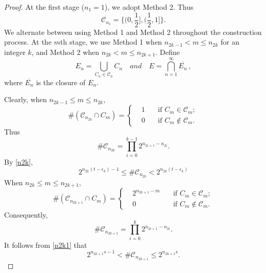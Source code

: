 \documentclass[12pt]{article}
\newcommand{\1}{{\bf 1}}
\begin{document}
\begin{proof}
		At the first stage ($n_1=1$), we adopt Method 2. Thus
		\begin{equation*}
			\textstyle{\mathcal{C}_{n_1}=\big\{(0,\frac{1}{2}],(\frac{1}{2},1]\big\}.}
		\end{equation*}
		We alternate between using Method 1 and Method 2 throughout the construction process.
		At the $m$th stage, we use Method 1 when $n_{2k-1}<m\leq n_{2k}$ for an integer $k$,  and Method 2 when $n_{2k}<m\leq n_{2k+1}$.
			Define
		\begin{equation*}
			E_n=\bigcup_{C_n\in \mathcal{C}_n}C_n \quad\textit{and}\quad E=\bigcap_{n =1}^\infty \overline{E_n}\, ,
		\end{equation*}
		where $\overline{E_n}$ is the closure of $E_n$.
		
		Clearly, when $n_{2k-1}\leq m\leq n_{2k}$,
		\begin{equation*}
			\#(\mathcal{C}_{n_{2k}}\cap C_{m})=\left\{
			\begin{aligned}
				&1 \quad&\text{if } C_{m}\in\mathcal{C}_{m};\\
				&0 \quad&\text{if } C_{m}\notin\mathcal{C}_{m}.
			\end{aligned}\right.
		\end{equation*}
		Thus 
		\begin{equation*}
			\#\mathcal{C}_{n_{2k}}=\prod_{i=0}^{k-1}2^{n_{2i+1}-n_{2i}}.
		\end{equation*}
		By \eqref{n2k}, 
		\begin{equation}\label{2k}
			2^{n_{2k}(t-\epsilon_k)-1}\leq\#\mathcal{C}_{n_{2k}}<2^{n_{2k}(t-\epsilon_k)}
		\end{equation}
		When $n_{2k}\leq m\leq n_{2k+1}$,
		\begin{equation*}
			\#(\mathcal{C}_{n_{2k+1}}\cap C_{m})=\left\{ 
			\begin{aligned}
				&2^{n_{2k+1}-m} \quad&\text{if } C_{m}\in\mathcal{C}_{m};\\
				&0 \quad&\text{if } C_{m}\notin\mathcal{C}_{m}.
			\end{aligned}\right.
		\end{equation*}
		Consequently,
		\begin{equation*}
			\#\mathcal{C}_{n_{2k+1}}=\prod_{i=0}^{k}2^{n_{2i+1}-n_{2i}}.
		\end{equation*}
		It follows from \eqref{n2k1} that
		\begin{equation}\label{2k+1}
			2^{n_{2k+1}s-1}<\#\mathcal{C}_{n_{2k+1}}\leq2^{n_{2k+1}s}.
		\end{equation}
		

\end{proof}
\end{document}
